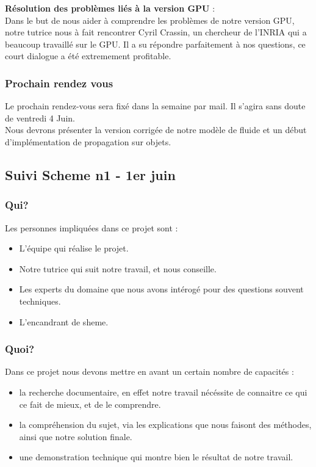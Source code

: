 \documentclass[a4paper,10pt]{article}
\begin{document}
\textbf{Résolution des problèmes liés à la version GPU} :  \\
    Dans le but de nous aider à comprendre les problèmes de notre version GPU, 
    notre tutrice nous à fait rencontrer Cyril Crassin, un chercheur de l'INRIA qui
    a beaucoup travaillé sur le GPU. Il a su répondre parfaitement à nos questions,
    ce court dialogue a été extremement profitable. \\

\subsubsection{Prochain rendez vous}
Le prochain rendez-vous sera fixé dans la semaine par mail. Il s'agira sans doute de ventredi 4 Juin.\\
Nous devrons présenter la version corrigée de notre modèle de fluide et un début d'implémentation de propagation
sur objets.\\



\subsection{Suivi Scheme n1 - 1er juin}
\subsubsection{Qui?}
Les personnes impliquées dans ce projet sont :
\begin{itemize}
\item L'équipe qui réalise le projet.
\item Notre tutrice qui suit notre travail, et nous conseille.
\item Les experts du domaine que nous avons intérogé pour des questions souvent techniques.
\item L'encandrant de sheme.
\end{itemize}

\subsubsection{Quoi?}
Dans ce projet nous devons mettre en avant un certain nombre de capacités :
\begin{itemize}
\item la recherche documentaire, en effet notre travail nécéssite de
  connaitre ce qui ce fait de mieux, et de le comprendre.
\item la compréhension du sujet, via les explications que nous faisont
  des méthodes, ainsi que notre solution finale.
\item une demonstration technique qui montre bien le résultat de notre
  travail.
\end{itemize}
\end{document}
